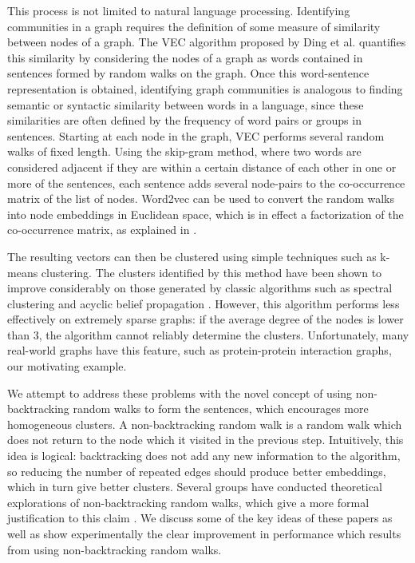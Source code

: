 \documentclass{article} %
\begin{document}
This process is not limited to natural language processing. Identifying communities in a graph requires the definition of some measure of similarity between nodes of a graph. The VEC algorithm proposed by Ding et al. \cite{NodeEmbed} quantifies this similarity by considering the nodes of a graph as words contained in sentences formed by random walks on the graph. Once this word-sentence representation is obtained, identifying graph communities is analogous to finding semantic or syntactic similarity between words in a language, since these similarities are often defined by the frequency of word pairs or groups in sentences. Starting at each node in the graph, VEC performs several random walks of fixed length. Using the skip-gram method, where two words are considered adjacent if they are within a certain distance of each other in one or more of the sentences, each sentence adds several node-pairs to the co-occurrence matrix of the list of nodes. Word2vec can be used to convert the random walks into node embeddings in Euclidean space, which is in effect a factorization of the co-occurrence matrix, as explained in \cite{LevyGoldberg}.

The resulting vectors can then be clustered using simple techniques such as k-means clustering. The clusters identified by this method have been shown to improve considerably on those generated by classic algorithms such as spectral clustering and acyclic belief propagation \cite{NodeEmbed}. However, this algorithm performs less effectively on extremely sparse graphs: if the average degree of the nodes is lower than 3, the algorithm cannot reliably determine the clusters. Unfortunately, many real-world graphs have this feature, such as protein-protein interaction graphs, our motivating example.

We attempt to address these problems with the novel concept of using non-backtracking random walks to form the sentences, which encourages more homogeneous clusters. A non-backtracking random walk is a random walk which does not return to the node which it visited in the previous step. Intuitively, this idea is logical: backtracking does not add any new information to the algorithm, so reducing the number of repeated edges should produce better embeddings, which in turn give better clusters. Several groups have conducted theoretical explorations of non-backtracking random walks, which give a more formal justification to this claim \cite{Alon, NBT-Ihara}. We discuss some of the key ideas of these papers as well as show experimentally the clear improvement in performance which results from using non-backtracking random walks.
\end{document}

